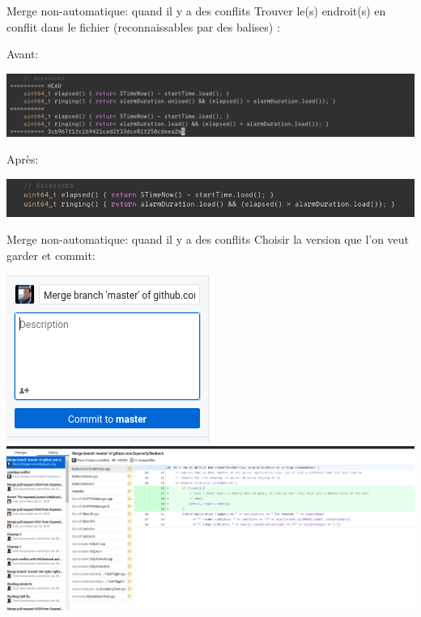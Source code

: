 \documentclass{beamer}
\begin{document}
\begin{frame}{Merge non-automatique: quand il y a des conflits}
    Trouver le(s) endroit(s) en conflit dans le fichier (reconnaissables par des balises) :

    Avant: 
    \begin{center}
        \includegraphics[width=\textwidth]{img/github_desktop/merge_before.png}
    \end{center}

    Après:
    \begin{center}
        \includegraphics[width=\textwidth]{img/github_desktop/merge_after.png}
    \end{center}
\end{frame}

\begin{frame}{Merge non-automatique: quand il y a des conflits}
    Choisir la version que l'on veut garder et commit:\\
    \begin{center}
        \includegraphics[width=.3\textwidth]{img/github_desktop/conflit_4.png}\\
        \includegraphics[width=.95\textwidth]{img/github_desktop/conflit_5.png}
    \end{center}
\end{frame}
\end{document}

